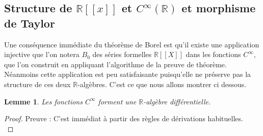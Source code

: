 \documentclass[12pt,a4paper]{amsart}
\newtheorem{lem}[thm]{\bf Lemme}
\begin{document}

\subsection{Structure de $\mathbb R[[x]]$ et $C^{\infty}(\mathbb R)$ et morphisme de Taylor}


Une conséquence immédiate du théorème de Borel est qu'il existe une application injective que l'on notera $B_{0}$ des séries formelles $\mathbb{R}[[X]]$ dans les fonctions $C^{\infty}$, que l'on construit en appliquant l'algorithme de la preuve de théorème. Néanmoins cette application est peu satisfaisante puisqu'elle ne préserve pas la structure de ces deux $\mathbb{R}$-algèbres. C'est ce que nous allons montrer ci dessous. \\

\begin{lem} 

Les fonctions $C^{\infty}$ forment une $\mathbb{R}$-algèbre différentielle. 
\end{lem}
\begin{proof}
Preuve : C'est immédiat à partir des règles de dérivations habituelles.\\
\end{proof}
\end{document}

